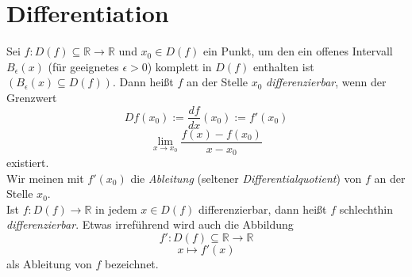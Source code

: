 \section{Differentiation}
\begin{Definition}{
	Sei $f: D \left( f \right) \subseteq \mathbb{R} \rightarrow \mathbb{R}$ 
	und $x_0 \in D \left( f \right)$ ein Punkt, 
	um den ein offenes Intervall $B_{\epsilon} \left( x \right)$ 
	(für geeignetes $\epsilon > 0$) komplett 
	in $D \left( f \right)$ enthalten ist $\left( B_{\epsilon} \left( x \right)
	 \subseteq D \left( f \right) \right) $. Dann heißt $f$ an der Stelle $x_0$ 
	 \emph{differenzierbar}, wenn der Grenzwert
	\begin{equation*}
		Df\left(x_0\right) := \frac{df}{dx} 
		\left( x_0 \right) := f'\left( x_0 \right) 
	\end{equation*}
	\begin{equation*}
	\lim\limits_{x \rightarrow x_0}{\frac{f 
	\left( x \right) - f \left( x_0 \right) }{x - x_0} }
	\end{equation*} 
	existiert. \\
	Wir meinen mit $f'\left(x_0\right)$ die \emph{Ableitung} 
	(seltener \emph{Differentialquotient}) von $f$ an der Stelle $x_0$. \\
	Ist $f: D\left(f \right) \rightarrow \mathbb{R}$ in jedem $x \in D\left(f\right)
	$ differenzierbar, dann heißt $f$ schlechthin \emph{differenzierbar}. 
	Etwas irreführend wird auch die Abbildung  
	\begin{equation*}
		f': D\left(f\right) \subseteq \mathbb{R} \rightarrow \mathbb{R}
	\end{equation*}
	\begin{equation*}
		x \mapsto f'(x)
	\end{equation*}
	als Ableitung von $f$ bezeichnet.
}\end{Definition}

